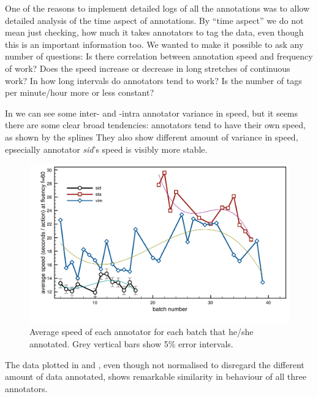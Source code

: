 One of the reasons to implement detailed logs of all the annotations  was to allow detailed analysis of the time aspect of annotations. By ``time aspect'' we do not mean just checking, how much it takes annotators to tag the data, even though this is an important information too. We wanted to make it possible to ask any number of questions: Is there correlation between annotation speed and frequency of work? Does the speed increase or decrease in long stretches of continuous work? In how long intervals do annotators tend to work? Is the number of tags per minute/hour more or less constant?  

In  we can see some inter- and -intra annotator variance in speed, but it seems there are some clear broad tendencies: annotators tend to have their own speed, as shown by the splines They also show different amount of variance in speed, epsecially annotator \emph{sid}'s speed is visibly more stable.

\begin{figure}[htbp]
   \centering
   \includegraphics[width=\textwidth]{images/speed/speed-anot3} 
   \caption{Average speed of each annotator for each batch that he/she annotated. Grey vertical bars show 5\% error intervals.}
   \label{fig:speed}
\end{figure}



The data plotted in  and , even though not normalised to disregard the different amount of data annotated, shows remarkable similarity in behaviour of all three annotators.


